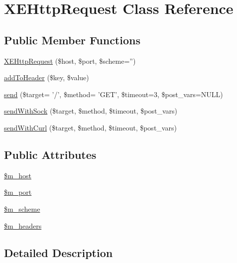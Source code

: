 \hypertarget{classXEHttpRequest}{\section{X\+E\+Http\+Request Class Reference}
\label{classXEHttpRequest}
}
\subsection*{Public Member Functions}
\begin{DoxyCompactItemize}
\item 
\hyperlink{classXEHttpRequest_aa8a672ad4e5c3cc8d3b7a9cecc29d349}{X\+E\+Http\+Request} (\$host, \$port, \$scheme='')
\item 
\hyperlink{classXEHttpRequest_af936bdc66e6dcabbd8934afc5e210063}{add\+To\+Header} (\$key, \$value)
\item 
\hyperlink{classXEHttpRequest_a8f75aef64b09a7b2d007bdce562eaaf6}{send} (\$target= '/', \$method= 'G\+E\+T', \$timeout=3, \$post\+\_\+vars=N\+U\+L\+L)
\item 
\hyperlink{classXEHttpRequest_a9e316ec4c68dfe9a124327287dae2754}{send\+With\+Sock} (\$target, \$method, \$timeout, \$post\+\_\+vars)
\item 
\hyperlink{classXEHttpRequest_ae6412b6f079b88a67f43602d3cdae2d7}{send\+With\+Curl} (\$target, \$method, \$timeout, \$post\+\_\+vars)
\end{DoxyCompactItemize}
\subsection*{Public Attributes}
\begin{DoxyCompactItemize}
\item 
\hyperlink{classXEHttpRequest_ad88148dced2b42017a96b2a5dd0b533a}{\$m\+\_\+host}
\item 
\hyperlink{classXEHttpRequest_a35c62f61b5ad2c200c53a58dd43a2784}{\$m\+\_\+port}
\item 
\hyperlink{classXEHttpRequest_a501919f00934ef2cc76300fa32c2f19d}{\$m\+\_\+scheme}
\item 
\hyperlink{classXEHttpRequest_a36df236b46af2f09dd9020096dbaed22}{\$m\+\_\+headers}
\end{DoxyCompactItemize}


\subsection{Detailed Description}


